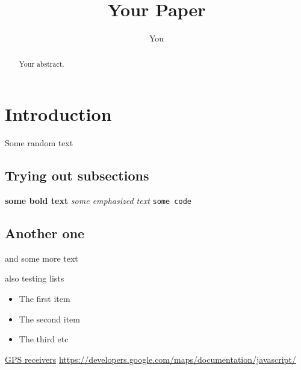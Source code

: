 \documentclass[12pt]{article}
\title{Your Paper}
\author{You}
\begin{document}
\maketitle

\begin{abstract}
Your abstract.
\end{abstract}

\section{Introduction}
Some random text
\subsection{Trying out subsections}

\textbf{some bold text} \newline
\emph{some emphasized text} \newline
\texttt{some code}

\subsection{Another one}
and some more text \newline

also testing lists
\begin{itemize} 
	\item The first item 
	\item The second item 
	\item The third etc 
\end{itemize}

\href{http://en.wikipedia.org/wiki/GPS_navigation_device}{GPS receivers}
\url{https://developers.google.com/maps/documentation/javascript/}

\end{document}
